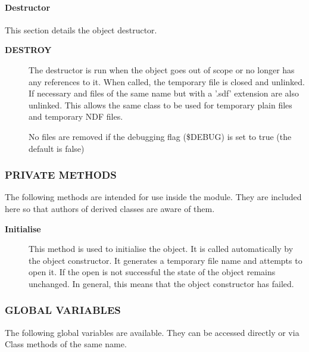 \paragraph*{Destructor\label{ORAC::TempFile_Destructor}}

This section details the object destructor.

\begin{description}
\item[\textbf{DESTROY}] \mbox{}

The destructor is run when the object goes out of scope
or no longer has any references to it. When called, the
temporary file is closed and unlinked. If necessary
and files of the same name but with a '.sdf' extension
are also unlinked. This allows the same class to be used
for temporary plain files and temporary NDF files.



No files are removed if the debugging flag (\$DEBUG) is set to
true (the default is false)

\end{description}
\subsubsection*{PRIVATE METHODS\label{ORAC::TempFile_PRIVATE_METHODS}}

The following methods are intended for use inside the module.
They are included here so that authors of derived classes are 
aware of them.

\begin{description}
\item[\textbf{Initialise}] \mbox{}

This method is used to initialise the object. It is called
automatically by the object constructor. It generates
a temporary file name and attempts to open it. If the 
open is not successful the state of the object remains 
unchanged. In general, this means that the object
constructor has failed.

\end{description}
\subsubsection*{GLOBAL VARIABLES\label{ORAC::TempFile_GLOBAL_VARIABLES}}

The following global variables are available.
They can be accessed directly or via Class methods of the same name.

